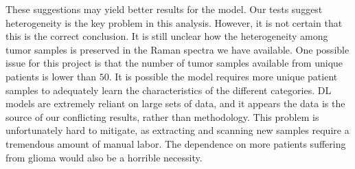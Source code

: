 These suggestions may yield better results for the model. Our tests suggest heterogeneity is the key problem in this analysis. However, it is not certain that this is the correct conclusion. It is still unclear how the heterogeneity among tumor samples is preserved in the Raman spectra we have available. One possible issue for this project is that the number of tumor samples available from unique patients is lower than $50$. It is possible the model requires more unique patient samples to adequately learn the characteristics of the different categories. DL models are extremely reliant on large sets of data, and it appears the data is the source of our conflicting results, rather than methodology. This problem is unfortunately hard to mitigate, as extracting and scanning new samples require a tremendous amount of manual labor. The dependence on more patients suffering from glioma would also be a horrible necessity.